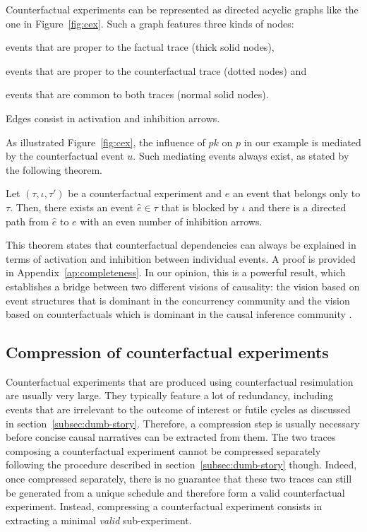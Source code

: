 Counterfactual experiments can be represented as directed acyclic graphs
like the one in Figure~\ref{fig:cex}. Such a graph features three kinds
of nodes:
\begin{inparaenum}[]
\item events that are proper to the factual trace (thick solid nodes),
\item events that are proper to the counterfactual trace (dotted nodes) and
\item events that are common to both traces (normal solid nodes).
\end{inparaenum} Edges consist in activation and inhibition arrows.


As illustrated Figure~\ref{fig:cex}, the influence of $pk$ on $p$ in
our example is mediated by the counterfactual event $u$. Such mediating
events always exist, as stated by the following theorem.

\begin{theorem}
\label{thm:completeness} 
  Let $(\tau, \iota, \tau')$ be a counterfactual experiment and $e$ an
  event that belongs only to $\tau$. Then, there exists an event
  $\hat e \in \tau$ that is blocked by $\iota$ and there is a directed
  path from $\hat e$ to $e$ with an even number of inhibition arrows.
\end{theorem}
\noindent This theorem states that counterfactual dependencies can
always be explained in terms of activation and inhibition between
individual events. A proof is provided in
Appendix~\ref{ap:completeness}. In our opinion, this is a powerful
result, which establishes a bridge between two different visions of
causality: the vision based on event structures
\cite{winskel1986event} that is dominant in the concurrency community
and the vision based on counterfactuals which is dominant in the
causal inference community \cite{pearl2009causality}.

\subsection{Compression of counterfactual experiments}

Counterfactual experiments that are produced using counterfactual
resimulation are usually very large. They typically feature a lot of
redundancy, including events that are irrelevant to the outcome of
interest or futile cycles as discussed in
section~\ref{subsec:dumb-story}. Therefore, a compression step is
usually necessary before concise causal narratives can be extracted
from them. The two traces composing a counterfactual experiment cannot
be compressed separately following the procedure described in
section~\ref{subsec:dumb-story} though. Indeed, once compressed
separately, there is no guarantee that these two traces can still be
generated from a unique schedule and therefore form a valid
counterfactual experiment. Instead, compressing a
counterfactual experiment consists in extracting a minimal \emph{valid}
sub-experiment.


